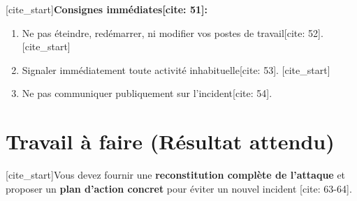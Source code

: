 \documentclass[a4paper,11pt]{article}
\begin{document}
[cite_start]\textbf{Consignes immédiates[cite: 51]:}
\begin{enumerate}
    \item Ne pas éteindre, redémarrer, ni modifier vos postes de travail[cite: 52].
    [cite_start]\item Signaler immédiatement toute activité inhabituelle[cite: 53].
    [cite_start]\item Ne pas communiquer publiquement sur l'incident[cite: 54].
\end{enumerate}

\section{Travail à faire (Résultat attendu)}
[cite_start]Vous devez fournir une \textbf{reconstitution complète de l’attaque} et proposer un \textbf{plan d’action concret} pour éviter un nouvel incident [cite: 63-64].
\end{document}
